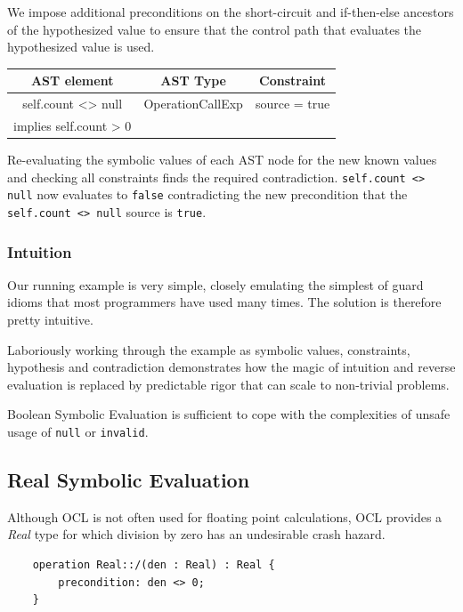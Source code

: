 \documentclass[
]{ceurart}
\begin{document}
We impose additional preconditions on the short-circuit and if-then-else ancestors of the hypothesized value to ensure that the control path that evaluates the hypothesized value is used.

\begin{center}
	\begin{tabular}{|c|c||c|}
		\hline
		AST element & AST Type & Constraint \\
		\hline
		\hline
        self.count <> null & OperationCallExp & source = true \\
		implies self.count > 0 && \\
		\hline
	\end{tabular}
\end{center}

Re-evaluating the symbolic values of each AST node for the new known values and checking all constraints finds the required contradiction. \verb|self.count <> null| now evaluates to \verb|false| contradicting the new precondition that the \verb|self.count <> null| source is \verb|true|.

\subsubsection{Intuition}
 
Our running example is very simple, closely emulating the simplest of guard idioms that most programmers have used many times. The solution is therefore pretty intuitive.

Laboriously working through the example as symbolic values, constraints, hypothesis and contradiction demonstrates how the magic of intuition and reverse evaluation is replaced by predictable rigor that can scale to non-trivial problems.

Boolean Symbolic Evaluation is sufficient to cope with the complexities of unsafe usage of \verb|null| or \verb|invalid|.

\subsection{Real Symbolic Evaluation}

Although OCL is not often used for floating point calculations, OCL provides a \emph{Real} type for which division by zero has an undesirable crash hazard.

\begin{verbatim}
    operation Real::/(den : Real) : Real {
        precondition: den <> 0;
    }
\end{verbatim}
\end{document}
